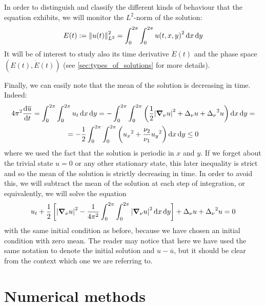 \documentclass[twoside]{article}
\begin{document}
In order to distinguish and classify the different kinds of behaviour that the equation exhibits, we will monitor the $L^2$-norm of the solution:
\begin{equation}
  E(t):=\left\|u(t)\right\|_{L^2}^2 = \int_0^{2\pi} \int_0^{2\pi} {u(t,x,y)}^2 \dd{x} \dd{y}
\end{equation}
It will be of interest to study also its time derivative $\dot{E}(t)$ and the phase space $(E(t), \dot{E}(t))$ (see \cref{sec:types_of_solutions} for more details).

Finally, we can easily note that the mean of the solution is decreasing in time. Indeed:
\begin{multline}
  4\pi^2\dv{\overline{u}}{t}= \int_0^{2\pi} \int_0^{2\pi} u_t \dd{x} \dd{y} = -\int_0^{2\pi} \int_0^{2\pi} \left( \frac{1}{2} \abs{\grad_\nu u}^2 + \Delta_\nu u + {\Delta_\nu}^2 u \right) \dd{x} \dd{y} =\\= -\frac{1}{2}\int_0^{2\pi} \int_0^{2\pi} \left({u_x}^2 + \frac{\nu_2}{\nu_1} {u_y}^2\right) \dd{x} \dd{y} \leq 0
\end{multline}
where we used the fact that the solution is periodic in $x$ and $y$. If we forget about the trivial state $u=0$ or any other stationary state, this later inequality is strict and so the mean of the solution is strictly decreasing in time. In order to avoid this, we will subtract the mean of the solution at each step of integration, or equivalently, we will solve the equation
\begin{equation}
  u_t + \frac{1}{2} \left[\abs{\grad_\nu u}^2 - \frac{1}{4\pi^2}\int_0^{2\pi} \int_0^{2\pi} \abs{\grad_\nu u}^2 \dd{x} \dd{y} \right] + \Delta_\nu u + {\Delta_\nu}^2 u = 0
\end{equation}
with the same initial condition as before, because we have chosen an initial condition with zero mean. The reader may notice that here we have used the same notation to denote the initial solution and $u-\overline{u}$, but it should be clear from the context which one we are referring to.
\section{Numerical methods}
\end{document}
